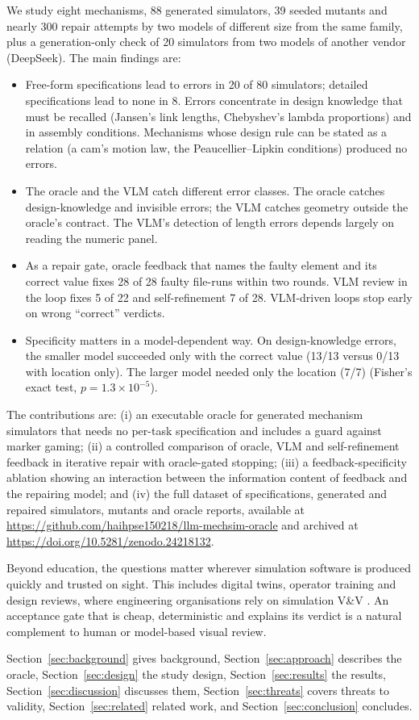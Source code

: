 We study eight mechanisms, 88 generated simulators, 39 seeded mutants and nearly 300 repair attempts by two models of different size from the same family, plus a generation-only check of 20 simulators from two models of another vendor (DeepSeek). The main findings are:
\begin{itemize}
\item Free-form specifications lead to errors in 20 of 80 simulators; detailed specifications lead to none in 8. Errors concentrate in design knowledge that must be recalled (Jansen's link lengths, Chebyshev's lambda proportions) and in assembly conditions. Mechanisms whose design rule can be stated as a relation (a cam's motion law, the Peaucellier--Lipkin conditions) produced no errors.
\item The oracle and the VLM catch different error classes. The oracle catches design-knowledge and invisible errors; the VLM catches geometry outside the oracle's contract. The VLM's detection of length errors depends largely on reading the numeric panel.
\item As a repair gate, oracle feedback that names the faulty element and its correct value fixes 28 of 28 faulty file-runs within two rounds. VLM review in the loop fixes 5 of 22 and self-refinement 7 of 28. VLM-driven loops stop early on wrong ``correct'' verdicts.
\item Specificity matters in a model-dependent way. On design-knowledge errors, the smaller model succeeded only with the correct value (13/13 versus 0/13 with location only). The larger model needed only the location (7/7) (Fisher's exact test, $p = 1.3\times10^{-5}$).
\end{itemize}

The contributions are: (i) an executable oracle for generated mechanism simulators that needs no per-task specification and includes a guard against marker gaming; (ii) a controlled comparison of oracle, VLM and self-refinement feedback in iterative repair with oracle-gated stopping; (iii) a feedback-specificity ablation showing an interaction between the information content of feedback and the repairing model; and (iv) the full dataset of specifications, generated and repaired simulators, mutants and oracle reports, available at \url{https://github.com/haihpse150218/llm-mechsim-oracle} and archived at \url{https://doi.org/10.5281/zenodo.24218132}.

Beyond education, the questions matter wherever simulation software is produced quickly and trusted on sight. This includes digital twins, operator training and design reviews, where engineering organisations rely on simulation V\&V \citep{sargent2013vv,balci1997vva}. An acceptance gate that is cheap, deterministic and explains its verdict is a natural complement to human or model-based visual review.

Section~\ref{sec:background} gives background, Section~\ref{sec:approach} describes the oracle, Section~\ref{sec:design} the study design, Section~\ref{sec:results} the results, Section~\ref{sec:discussion} discusses them, Section~\ref{sec:threats} covers threats to validity, Section~\ref{sec:related} related work, and Section~\ref{sec:conclusion} concludes.
